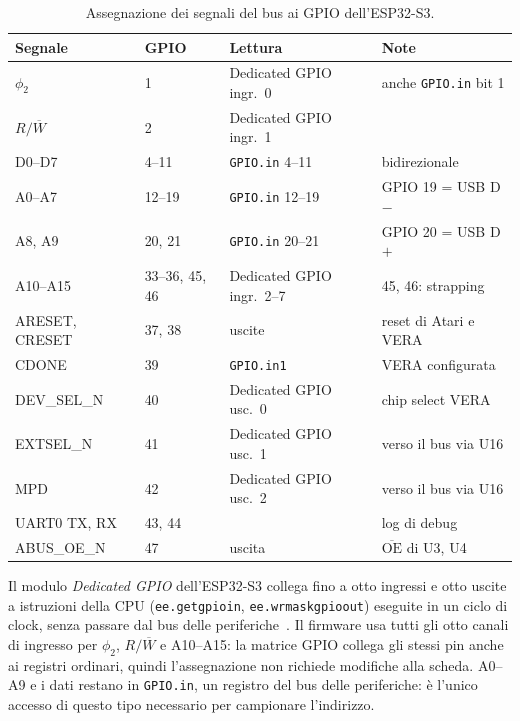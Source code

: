 \documentclass[11pt,a4paper,twoside,openright]{report}
\DeclareRobustCommand{\code}[1]{\begingroup\renewcommand{\_}{\textunderscore\allowbreak}\texttt{#1}\endgroup}
\newcommand{\sig}[1]{\textsf{#1}}
\begin{document}
\begin{table}[htbp]
  \centering
  \caption{Assegnazione dei segnali del bus ai GPIO dell'ESP32-S3.}
  \label{tab:pin}
  \small
  \begin{tabular}{llll}
    \toprule
    \textbf{Segnale} & \textbf{GPIO} & \textbf{Lettura} & \textbf{Note} \\
    \midrule
    $\phi_2$                & 1          & Dedicated GPIO ingr.\ 0 & anche \code{GPIO.in} bit 1 \\
    $R/\overline{W}$         & 2          & Dedicated GPIO ingr.\ 1 & \\
    D0--D7                  & 4--11      & \code{GPIO.in} 4--11    & bidirezionale \\
    A0--A7                  & 12--19     & \code{GPIO.in} 12--19   & GPIO 19 = USB D$-$ \\
    A8, A9                  & 20, 21     & \code{GPIO.in} 20--21   & GPIO 20 = USB D$+$ \\
    A10--A15                & 33--36, 45, 46 & Dedicated GPIO ingr.\ 2--7 & 45, 46: strapping \\
    \sig{ARESET}, \sig{CRESET} & 37, 38  & uscite                 & reset di Atari e VERA \\
    \sig{CDONE}             & 39         & \code{GPIO.in1}         & VERA configurata \\
    \sig{DEV\_SEL\_N}       & 40         & Dedicated GPIO usc.\ 0  & chip select VERA \\
    \sig{EXTSEL\_N}         & 41         & Dedicated GPIO usc.\ 1  & verso il bus via U16 \\
    \sig{MPD}               & 42         & Dedicated GPIO usc.\ 2  & verso il bus via U16 \\
    UART0 TX, RX            & 43, 44     &                        & log di debug \\
    \sig{ABUS\_OE\_N}       & 47         & uscita                 & $\overline{\text{OE}}$ di U3, U4 \\
    \bottomrule
  \end{tabular}
\end{table}

Il modulo \emph{Dedicated GPIO} dell'ESP32-S3 collega fino a otto ingressi e otto uscite a
istruzioni della CPU (\code{ee.get\_gpio\_in}, \code{ee.wr\_mask\_gpio\_out}) eseguite in un
ciclo di clock, senza passare dal bus delle periferiche~\cite{esp32s3trm,idfdedic}. Il
firmware usa tutti gli otto canali di ingresso per $\phi_2$, $R/\overline{W}$ e A10--A15: la
matrice GPIO collega gli stessi pin anche ai registri ordinari, quindi l'assegnazione non
richiede modifiche alla scheda. A0--A9 e i dati restano in \code{GPIO.in}, un registro
del bus delle periferiche: è l'unico accesso di questo tipo necessario per campionare
l'indirizzo.
\end{document}
